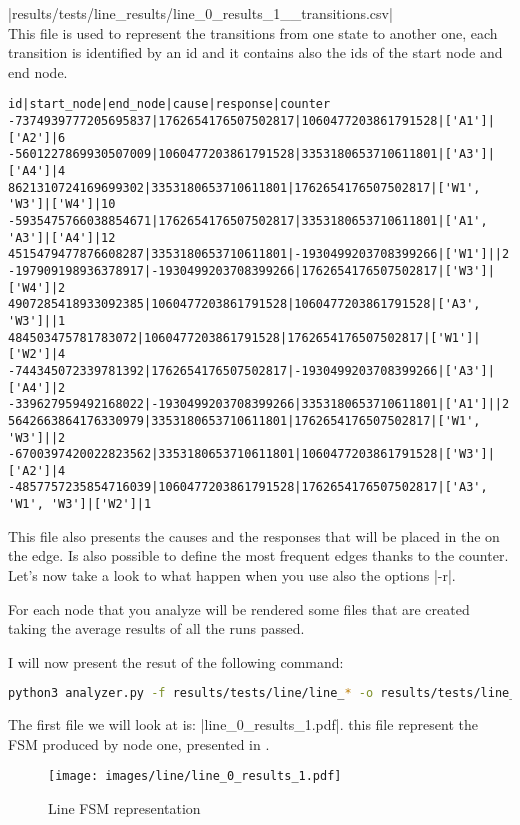 \documentclass[10pt,journal,onecolumn]{IEEEtran}
\begin{document}
|results/tests/line_results/line_0_results_1__transitions.csv|\\

This file is used to represent the transitions from one state to another
one, each transition is identified by an id and it contains also the ids of
the start node and end node.
\begin{lstlisting}[language=csv]
id|start_node|end_node|cause|response|counter
-7374939777205695837|1762654176507502817|1060477203861791528|['A1']|['A2']|6
-5601227869930507009|1060477203861791528|3353180653710611801|['A3']|['A4']|4
8621310724169699302|3353180653710611801|1762654176507502817|['W1', 'W3']|['W4']|10
-5935475766038854671|1762654176507502817|3353180653710611801|['A1', 'A3']|['A4']|12
4515479477876608287|3353180653710611801|-1930499203708399266|['W1']||2
-197909198936378917|-1930499203708399266|1762654176507502817|['W3']|['W4']|2
4907285418933092385|1060477203861791528|1060477203861791528|['A3', 'W3']||1
484503475781783072|1060477203861791528|1762654176507502817|['W1']|['W2']|4
-744345072339781392|1762654176507502817|-1930499203708399266|['A3']|['A4']|2
-339627959492168022|-1930499203708399266|3353180653710611801|['A1']||2
5642663864176330979|3353180653710611801|1762654176507502817|['W1', 'W3']||2
-6700397420022823562|3353180653710611801|1060477203861791528|['W3']|['A2']|4
-4857757235854716039|1060477203861791528|1762654176507502817|['A3', 'W1', 'W3']|['W2']|1
\end{lstlisting}
This file also presents the causes and the responses that will be placed in the
on the edge.
Is also possible to define the most frequent edges thanks to the counter.\\

Let's now take a look to what happen when you use also the options |-r|.

For each node that you analyze will be rendered some files that are created
taking the average results of all the runs passed.

I will now present the resut of the following command:
\begin{lstlisting}[language=bash]
python3 analyzer.py -f results/tests/line/line_* -o results/tests/line_results/line_0_results -n 1 -r
\end{lstlisting}

The first file we will look at is: |line_0_results_1.pdf|. this file represent
the \ac{FSM} produced by node one, presented in .

\begin{figure}[H]
    \centering
    \texttt{[image: images/line/line\_0\_results\_1.pdf]}
	\caption{Line \ac{FSM} representation}
    \label{fig:line_fsm}
\end{figure}
\end{document}
